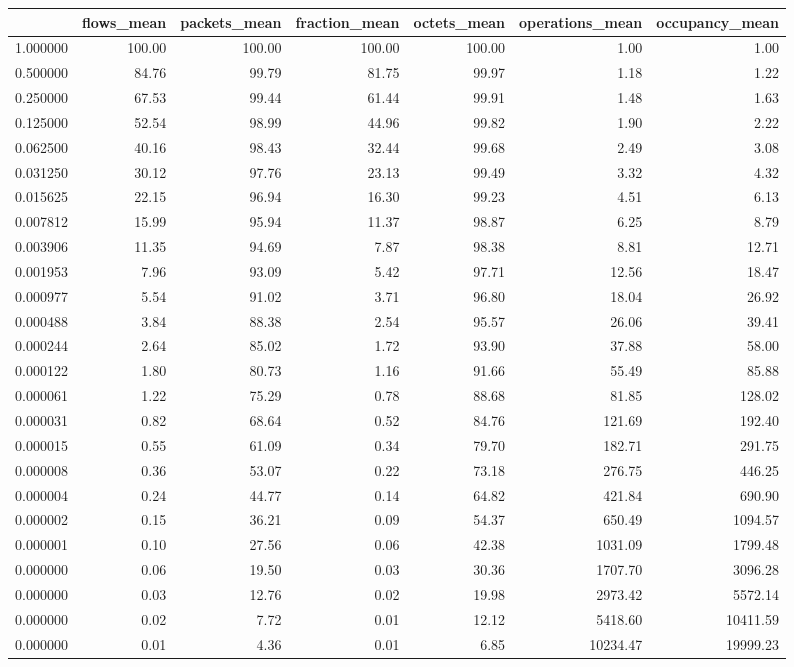 \begin{tabular}{lrrrrrr}
\toprule
 & flows_mean & packets_mean & fraction_mean & octets_mean & operations_mean & occupancy_mean \\
\midrule
1.000000 & 100.00 & 100.00 & 100.00 & 100.00 & 1.00 & 1.00 \\
0.500000 & 84.76 & 99.79 & 81.75 & 99.97 & 1.18 & 1.22 \\
0.250000 & 67.53 & 99.44 & 61.44 & 99.91 & 1.48 & 1.63 \\
0.125000 & 52.54 & 98.99 & 44.96 & 99.82 & 1.90 & 2.22 \\
0.062500 & 40.16 & 98.43 & 32.44 & 99.68 & 2.49 & 3.08 \\
0.031250 & 30.12 & 97.76 & 23.13 & 99.49 & 3.32 & 4.32 \\
0.015625 & 22.15 & 96.94 & 16.30 & 99.23 & 4.51 & 6.13 \\
0.007812 & 15.99 & 95.94 & 11.37 & 98.87 & 6.25 & 8.79 \\
0.003906 & 11.35 & 94.69 & 7.87 & 98.38 & 8.81 & 12.71 \\
0.001953 & 7.96 & 93.09 & 5.42 & 97.71 & 12.56 & 18.47 \\
0.000977 & 5.54 & 91.02 & 3.71 & 96.80 & 18.04 & 26.92 \\
0.000488 & 3.84 & 88.38 & 2.54 & 95.57 & 26.06 & 39.41 \\
0.000244 & 2.64 & 85.02 & 1.72 & 93.90 & 37.88 & 58.00 \\
0.000122 & 1.80 & 80.73 & 1.16 & 91.66 & 55.49 & 85.88 \\
0.000061 & 1.22 & 75.29 & 0.78 & 88.68 & 81.85 & 128.02 \\
0.000031 & 0.82 & 68.64 & 0.52 & 84.76 & 121.69 & 192.40 \\
0.000015 & 0.55 & 61.09 & 0.34 & 79.70 & 182.71 & 291.75 \\
0.000008 & 0.36 & 53.07 & 0.22 & 73.18 & 276.75 & 446.25 \\
0.000004 & 0.24 & 44.77 & 0.14 & 64.82 & 421.84 & 690.90 \\
0.000002 & 0.15 & 36.21 & 0.09 & 54.37 & 650.49 & 1094.57 \\
0.000001 & 0.10 & 27.56 & 0.06 & 42.38 & 1031.09 & 1799.48 \\
0.000000 & 0.06 & 19.50 & 0.03 & 30.36 & 1707.70 & 3096.28 \\
0.000000 & 0.03 & 12.76 & 0.02 & 19.98 & 2973.42 & 5572.14 \\
0.000000 & 0.02 & 7.72 & 0.01 & 12.12 & 5418.60 & 10411.59 \\
0.000000 & 0.01 & 4.36 & 0.01 & 6.85 & 10234.47 & 19999.23 \\
\bottomrule
\end{tabular}
